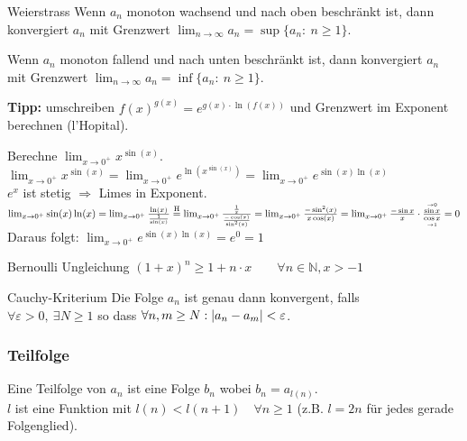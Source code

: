 \documentclass[a4paper,fontsize = 7pt]{scrartcl}
\def\limn{\lim_{n\to \infty}}
\def\N{\mathbb{N}}
\begin{document}
\begin{mainbox}{Weierstrass}
Wenn $a_n$ monoton wachsend und nach oben beschränkt ist, dann konvergiert $a_n$ mit Grenzwert $\limn a_n = \sup \{a_n : \ n \ge 1\}$.

Wenn $a_n$ monoton fallend und nach unten beschränkt ist, dann konvergiert $a_n$ mit Grenzwert $\limn a_n = \inf \{a_n : \ n \ge 1\}$.
\end{mainbox}

\textbf{Tipp:} umschreiben $f(x)^{g(x)} = e^{g(x) \cdot \ln \left( f(x) \right)}$ und Grenzwert im Exponent berechnen (l'Hopital).
\begin{subbox}{	Berechne $\lim_{x \to 0^+} x^{\sin(x)}$.}
  \vspace{-6pt}
		$\lim_{x \to 0^+} x^{\sin(x)} = \lim_{x \to 0^+} e^{ \ln \left( x^{\sin(x)} \right)} 
    = \lim_{x \to 0^+} e^{\sin (x) \ln (x)}$
	\\$e^x$ ist stetig $\Rightarrow$ Limes in Exponent.
	$
		\lim_{x \to 0^+} \sin(x) \ln(x) = \lim_{x \to 0^+} \frac{\ln(x)}{\frac{1}{\sin(x)}}
		\\\overset{\text{H}}{=} \lim_{x \to 0^+} \frac{\frac{1}{x}}{\frac{-\cos (x)}{\sin^2 (x)}} = \lim_{x \to0^+} \frac{- \sin^2 (x)}{x \cos (x)}\\
						= \lim_{x \to 0^+} \frac{- \sin x}{x} \cdot \frac{\overset{\to 0}{\sin x}}{\underset{\to 1}{\cos x}} = 0
	$
	\\Daraus folgt: $\lim_{x \to 0^+} e^{\sin (x) \ln (x)} = e^0 = 1$
  \vspace{-4pt}
\end{subbox}

\begin{mainbox}{Bernoulli Ungleichung}
  \vspace{-4pt}
  $(1 + x)^n \geq 1 + n \cdot x \qquad \forall n \in \N, x > -1$
  \vspace{-4pt}
\end{mainbox}

\begin{mainbox}{Cauchy-Kriterium}
  \vspace{-4pt}
Die Folge $a_n$ ist genau dann konvergent, falls \\ $\forall \varepsilon > 0, \ \exists N \ge 1$ so dass $\forall n,m \ge N: \\ | a_n - a_m | < \varepsilon$.
  \vspace{-4pt}
\end{mainbox}

\subsubsection{Teilfolge}
Eine Teilfolge von $a_n$ ist eine Folge $b_n$ wobei $b_n = a_{l(n)}$.
\\ $l$ ist eine Funktion mit $l(n) < l(n+1) \quad \forall n \ge 1$ (z.B. $l = 2n$ für jedes gerade Folgenglied). 
\end{document}
